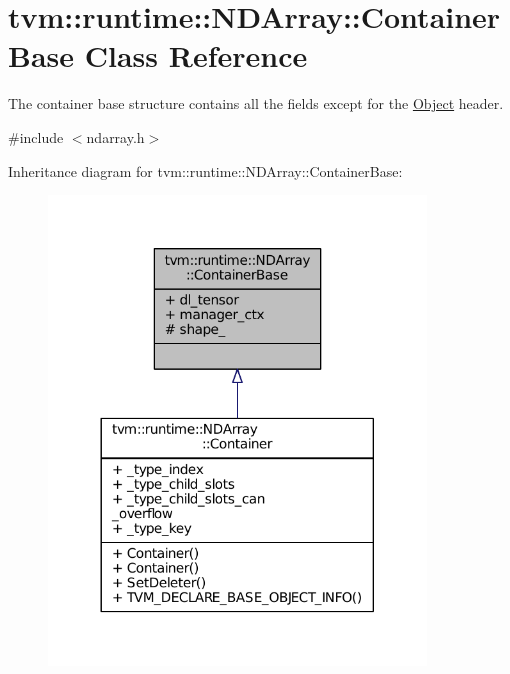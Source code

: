 \hypertarget{classtvm_1_1runtime_1_1NDArray_1_1ContainerBase}{}\section{tvm\+:\+:runtime\+:\+:N\+D\+Array\+:\+:Container\+Base Class Reference}
\label{classtvm_1_1runtime_1_1NDArray_1_1ContainerBase}


The container base structure contains all the fields except for the \hyperlink{classtvm_1_1runtime_1_1Object}{Object} header.  




{\ttfamily \#include $<$ndarray.\+h$>$}



Inheritance diagram for tvm\+:\+:runtime\+:\+:N\+D\+Array\+:\+:Container\+Base\+:
\nopagebreak
\begin{figure}[H]
\begin{center}
\leavevmode
\includegraphics[width=284pt]{classtvm_1_1runtime_1_1NDArray_1_1ContainerBase__inherit__graph}
\end{center}
\end{figure}


